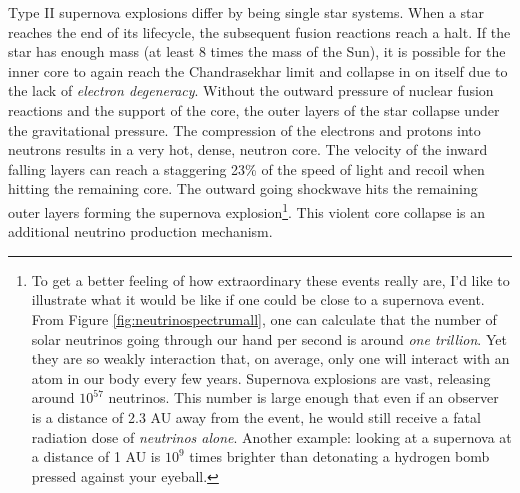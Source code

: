 Type II supernova explosions differ by being single star systems. When a star reaches the end of its lifecycle, the subsequent fusion reactions reach a halt. If the star has enough mass (at least 8 times the mass of the Sun), it is possible for the inner core to again reach the Chandrasekhar limit and collapse in on itself due to the lack of \textit{electron degeneracy}. Without the outward pressure of nuclear fusion reactions and the support of the core, the outer layers of the star collapse under the gravitational pressure. The compression of the electrons and protons into neutrons results in a very hot, dense, neutron core. The velocity of the inward falling layers can reach a staggering 23\% of the speed of light and recoil when hitting the remaining core. The outward going shockwave hits the remaining outer layers forming the supernova explosion\footnote{To get a better feeling of how extraordinary these events really are, I'd like to illustrate what it would be like if one could be close to a supernova event. From Figure \ref{fig:neutrinospectrumall}, one can calculate that the number of solar neutrinos going through our hand per second is around \textit{one trillion}. Yet they are so weakly interaction that, on average, only one will interact with an atom in our body every few years. Supernova explosions are vast, releasing around $10^{57}$ neutrinos. This number is large enough that even if an observer is a distance of 2.3 AU away from the event, he would still receive a fatal radiation dose of \textit{neutrinos alone}. Another example: looking at a supernova at a distance of 1 AU is $10^9$ times brighter than detonating a hydrogen bomb pressed against your eyeball.}. This violent core collapse is an additional neutrino production mechanism.

